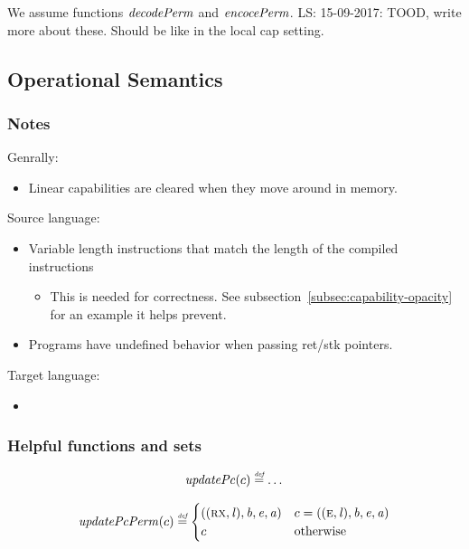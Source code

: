 \documentclass[a4paper]{article}
\newcommand\lau[1]{{\color{purple} \sf \footnotesize {LS: #1}}\\}
\newcommand{\defeq}{\stackrel{\textit{\tiny{def}}}{=}}
\newcommand{\totherwise}{\text{otherwise }}
\newcommand{\lin}{\var{l}}
\newcommand{\var}[1]{\mathit{#1}}
\newcommand{\baddr}{\var{b}}
\newcommand{\eaddr}{\var{e}}
\newcommand{\aaddr}{\var{a}}
\newcommand{\plainperm}[1]{\textsc{#1}}
\newcommand{\rx}{\plainperm{rx}}
\newcommand{\enter}{\plainperm{e}}
\newcommand{\plainfun}[2]{
  \ifthenelse{\equal{#2}{}}
  {\mathit{#1}}
  {\mathit{#1}(#2)}
}
\newcommand{\encPerm}[1]{\plainfun{encocePerm}{#1}}
\newcommand{\decPerm}[1]{\plainfun{decodePerm}{#1}}
\newcommand{\updPcAddr}[1]{\plainfun{updatePc}{#1}}
\newcommand{\updPcPerm}[1]{\plainfun{updatePcPerm}{#1}}
\begin{document}
We assume functions $\decPerm{}$ and $\encPerm{}$.
\lau{15-09-2017: TOOD, write more about these. Should be like in the local cap setting.}

\subsection{Operational Semantics}
\subsubsection{Notes}
Genrally:
\begin{itemize}
\item Linear capabilities are cleared when they move around in memory.
\end{itemize}

Source language:
\begin{itemize}
\item Variable length instructions that match the length of the compiled instructions
  \begin{itemize}
  \item This is needed for correctness. See subsection~\ref{subsec:capability-opacity} for an example it helps prevent.
  \end{itemize}
\item Programs have undefined behavior when passing ret/stk pointers.
\end{itemize}

Target language:
\begin{itemize}
\item 
\end{itemize}

\subsubsection{Helpful functions and sets}


\[
  \updPcAddr{c} \defeq \dots
\]

\[
  \updPcPerm{c} \defeq
  \begin{cases}
    ((\rx,\lin),\baddr,\eaddr,\aaddr) & c = ((\enter,\lin),\baddr,\eaddr,\aaddr)\\
    c & \totherwise
  \end{cases}
\]
\end{document}

